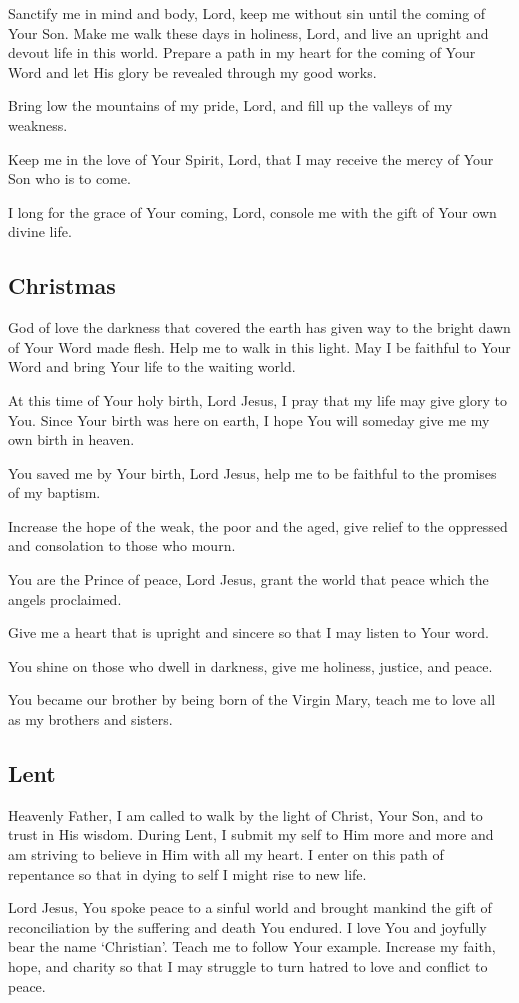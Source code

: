 \documentclass[12pt]{article}
\newcommand{\prayertitle}[1]{\subsection{#1}}
\begin{document}
Sanctify me in mind and body, Lord, keep me without sin until the coming of Your Son.
Make me walk these days in holiness, Lord, and live an upright and devout life in this world.
Prepare a path in my heart for the coming of Your Word and let His glory be revealed through my good works.

Bring low the mountains of my pride, Lord, and fill up the valleys of my weakness.

Keep me in the love of Your Spirit, Lord, that I may receive the mercy of Your Son who is to come.

I long for the grace of Your coming, Lord, console me with the gift of Your own divine life.

\prayertitle{Christmas}
God of love the darkness that covered the earth has given way to the bright dawn of Your Word made flesh.
Help me to walk in this light.
May I be faithful to Your Word and bring Your life to the waiting world.

At this time of Your holy birth, Lord Jesus, I pray that my life may give glory to You.
Since Your birth was here on earth, I hope You will someday give me my own birth in heaven.

You saved me by Your birth, Lord Jesus, help me to be faithful to the promises of my baptism.

Increase the hope of the weak, the poor and the aged, give relief to the oppressed and consolation to those who mourn.

You are the Prince of peace, Lord Jesus, grant the world that peace which the angels proclaimed.

Give me a heart that is upright and sincere so that I may listen to Your word.

You shine on those who dwell in darkness, give me holiness, justice, and peace.

You became our brother by being born of the Virgin Mary, teach me to love all as my brothers and sisters.

\prayertitle{Lent}
Heavenly Father, I am called to walk by the light of Christ, Your Son, and to trust in His wisdom.
During Lent, I submit my self to Him more and more and am striving to believe in Him with all my heart.
I enter on this path of repentance so that in dying to self I might rise to new life.

Lord Jesus, You spoke peace to a sinful world and brought mankind the gift of reconciliation by the suffering and death You endured.
I love You and joyfully bear the name `Christian'.
Teach me to follow Your example.
Increase my faith, hope, and charity so that I may struggle to turn hatred to love and conflict to peace.
\end{document}
